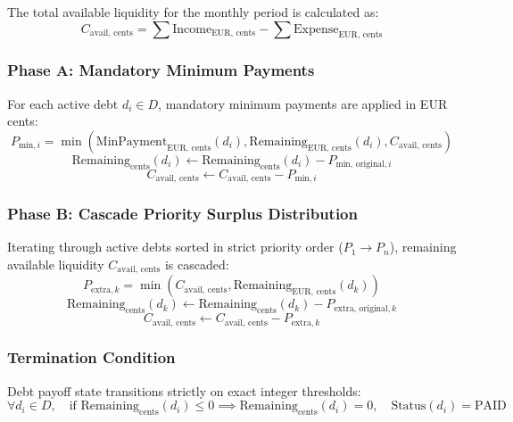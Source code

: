\documentclass[11pt,a4paper]{article}
\begin{document}
The total available liquidity for the monthly period is calculated as:
\begin{equation}
C_{\text{avail, cents}} = \sum \text{Income}_{\text{EUR, cents}} - \sum \text{Expense}_{\text{EUR, cents}}
\end{equation}

\subsubsection{Phase A: Mandatory Minimum Payments}
For each active debt $d_i \in D$, mandatory minimum payments are applied in EUR cents:
\begin{equation}
P_{\text{min}, i} = \min\left(\text{MinPayment}_{\text{EUR, cents}}(d_i), \text{Remaining}_{\text{EUR, cents}}(d_i), C_{\text{avail, cents}}\right)
\end{equation}
\begin{equation}
\text{Remaining}_{\text{cents}}(d_i) \leftarrow \text{Remaining}_{\text{cents}}(d_i) - P_{\text{min, original}, i}
\end{equation}
\begin{equation}
C_{\text{avail, cents}} \leftarrow C_{\text{avail, cents}} - P_{\text{min}, i}
\end{equation}

\subsubsection{Phase B: Cascade Priority Surplus Distribution}
Iterating through active debts sorted in strict priority order ($P_1 \to P_n$), remaining available liquidity $C_{\text{avail, cents}}$ is cascaded:
\begin{equation}
P_{\text{extra}, k} = \min\left(C_{\text{avail, cents}}, \text{Remaining}_{\text{EUR, cents}}(d_k)\right)
\end{equation}
\begin{equation}
\text{Remaining}_{\text{cents}}(d_k) \leftarrow \text{Remaining}_{\text{cents}}(d_k) - P_{\text{extra, original}, k}
\end{equation}
\begin{equation}
C_{\text{avail, cents}} \leftarrow C_{\text{avail, cents}} - P_{\text{extra}, k}
\end{equation}

\subsubsection{Termination Condition}
Debt payoff state transitions strictly on exact integer thresholds:
\begin{equation}
\forall d_i \in D, \quad \text{if } \text{Remaining}_{\text{cents}}(d_i) \le 0 \implies \text{Remaining}_{\text{cents}}(d_i) = 0, \quad \text{Status}(d_i) = \text{PAID}
\end{equation}
\end{document}
